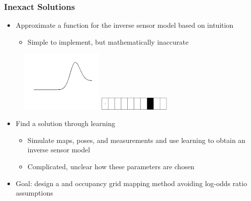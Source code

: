 \documentclass[11pt,professionalfonts,hyperref={pdftex,pdfpagemode=none,pdfstartview=FitH}]{beamer}
\renewcommand{\emph}[1]{\textit{\textbf{\color{blue}{#1}}}}
\begin{document}
\begin{frame}
\frametitle{Inexact Solutions}

\begin{minipage}[t]{7.0cm}
\begin{itemize}
	\item Approximate a function for the inverse sensor model based on intuition
	\begin{itemize}
		\item Simple to implement, but mathematically inaccurate
	\end{itemize}
\end{itemize}
\end{minipage}
\begin{minipage}[t]{3.0cm}
\begin{figure}[!htbp]
\centerline{
    \vspace*{-0.5cm}
    \includegraphics[width=4.0cm]{Approx_ISM_shortened.png}\hspace*{0.1cm}
    }
\centerline{
    \includegraphics[width=3.5cm]{1D_True_Grid.png}
    }
		\end{figure}
\end{minipage}
\vspace*{-0.5cm}
\vspace*{0.0cm}\pause
\begin{itemize}
	\item Find a solution through learning
	\begin{itemize}
		\item Simulate maps, poses, and measurements and use learning to obtain an inverse sensor model
		\item Complicated, unclear how these parameters are chosen
	\end{itemize}
	\vspace*{0.0cm}\pause
	\item Goal: design a \emph{simple} and \emph{accurate} occupancy grid mapping method avoiding log-odds ratio assumptions
\end{itemize}


\end{frame}
\end{document}
